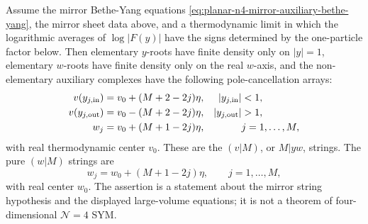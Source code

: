 \begin{proposition}
\label{prop:planar-n4-mirror-auxiliary-strings}
Assume the mirror Bethe-Yang equations
\eqref{eq:planar-n4-mirror-auxiliary-bethe-yang}, the mirror sheet data
above, and a thermodynamic limit in which the logarithmic averages of
\(\log\lvert F(y)\rvert\) have the signs determined by the one-particle
factor below.  Then elementary \(y\)-roots have finite density only on
\(\lvert y\rvert=1\), elementary \(w\)-roots have finite density only on the
real \(w\)-axis, and the non-elementary auxiliary complexes have the
following pole-cancellation arrays:
\[
\begin{aligned}
  v(y_{j,{\rm in}})&=v_0+(M+2-2j)\eta,
  &
  \lvert y_{j,{\rm in}}\rvert&<1,
  \\
  v(y_{j,{\rm out}})&=v_0-(M+2-2j)\eta,
  &
  \lvert y_{j,{\rm out}}\rvert&>1,
  \\
  w_j&=v_0+(M+1-2j)\eta,
  &&
  j=1,\ldots,M,
\end{aligned}
\]
with real thermodynamic center \(v_0\).  These are the \((v|M)\), or
\(M|yw\), strings.  The pure \((w|M)\) strings are
\[
  w_j=w_0+(M+1-2j)\eta,
  \qquad j=1,\ldots,M,
\]
with real center \(w_0\).  The assertion is a statement about the mirror
string hypothesis and the displayed large-volume equations; it is not a
theorem of four-dimensional \(\mathcal N=4\) SYM.
\end{proposition}


